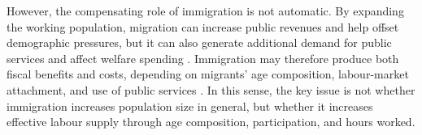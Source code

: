 \vspace{0.7em}\par
However, the compensating role of immigration is not automatic. By expanding the working population, migration can increase public revenues and help offset demographic pressures, but it can also generate additional demand for public services and affect welfare spending \parencite{fiorio2023migration,naumann2021population}. Immigration may therefore produce both fiscal benefits and costs, depending on migrants' age composition, labour-market attachment, and use of public services \parencite{preston2014effect}. In this sense, the key issue is not whether immigration increases population size in general, but whether it increases effective labour supply through age composition, participation, and hours worked.

